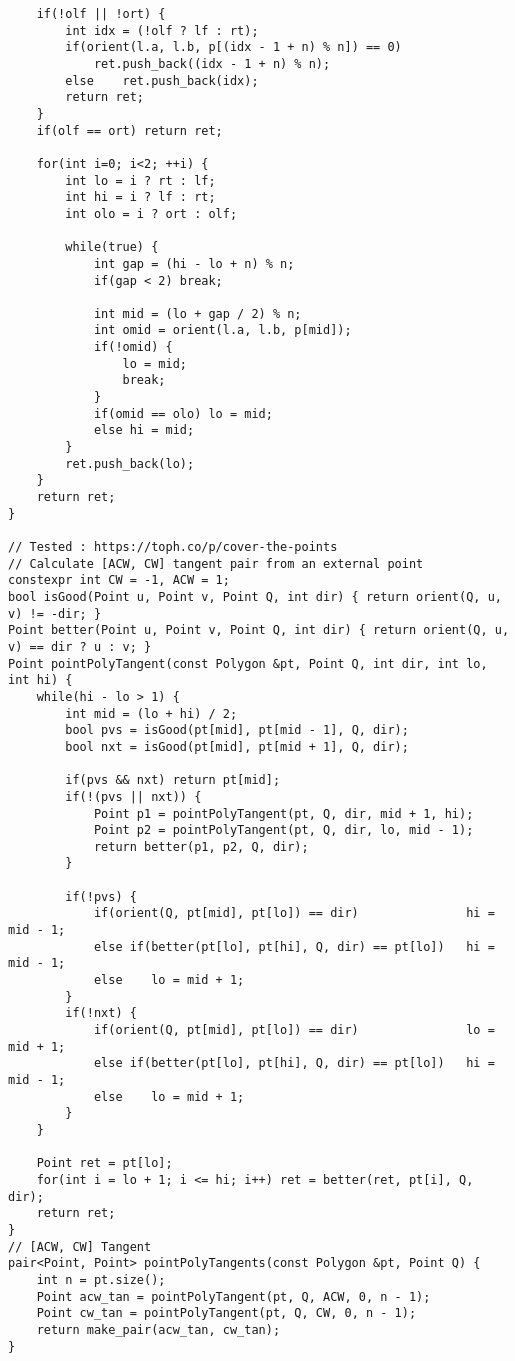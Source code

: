 \documentclass[FSZ,a4paper,onesided]{article}
\begin{document}
\begin{multicols*}{\COLS}
\begin{lstlisting}
    if(!olf || !ort) {
        int idx = (!olf ? lf : rt);
        if(orient(l.a, l.b, p[(idx - 1 + n) % n]) == 0)
            ret.push_back((idx - 1 + n) % n);
        else    ret.push_back(idx);
        return ret;
    }
    if(olf == ort) return ret;

    for(int i=0; i<2; ++i) {
        int lo = i ? rt : lf;
        int hi = i ? lf : rt;
        int olo = i ? ort : olf;

        while(true) {
            int gap = (hi - lo + n) % n;
            if(gap < 2) break;

            int mid = (lo + gap / 2) % n;
            int omid = orient(l.a, l.b, p[mid]);
            if(!omid) {
                lo = mid;
                break;
            }
            if(omid == olo) lo = mid;
            else hi = mid;
        }
        ret.push_back(lo);
    }
    return ret;
}

// Tested : https://toph.co/p/cover-the-points
// Calculate [ACW, CW] tangent pair from an external point
constexpr int CW = -1, ACW = 1;
bool isGood(Point u, Point v, Point Q, int dir) { return orient(Q, u, v) != -dir; }
Point better(Point u, Point v, Point Q, int dir) { return orient(Q, u, v) == dir ? u : v; }
Point pointPolyTangent(const Polygon &pt, Point Q, int dir, int lo, int hi) {
    while(hi - lo > 1) {
        int mid = (lo + hi) / 2;
        bool pvs = isGood(pt[mid], pt[mid - 1], Q, dir);
        bool nxt = isGood(pt[mid], pt[mid + 1], Q, dir);

        if(pvs && nxt) return pt[mid];
        if(!(pvs || nxt)) {
            Point p1 = pointPolyTangent(pt, Q, dir, mid + 1, hi);
            Point p2 = pointPolyTangent(pt, Q, dir, lo, mid - 1);
            return better(p1, p2, Q, dir);
        }

        if(!pvs) {
            if(orient(Q, pt[mid], pt[lo]) == dir)               hi = mid - 1;
            else if(better(pt[lo], pt[hi], Q, dir) == pt[lo])   hi = mid - 1;
            else    lo = mid + 1;
        }
        if(!nxt) {
            if(orient(Q, pt[mid], pt[lo]) == dir)               lo = mid + 1;
            else if(better(pt[lo], pt[hi], Q, dir) == pt[lo])   hi = mid - 1;
            else    lo = mid + 1;
        }
    }

    Point ret = pt[lo];
    for(int i = lo + 1; i <= hi; i++) ret = better(ret, pt[i], Q, dir);
    return ret;
}
// [ACW, CW] Tangent
pair<Point, Point> pointPolyTangents(const Polygon &pt, Point Q) {
    int n = pt.size();
    Point acw_tan = pointPolyTangent(pt, Q, ACW, 0, n - 1);
    Point cw_tan = pointPolyTangent(pt, Q, CW, 0, n - 1);
    return make_pair(acw_tan, cw_tan);
}\end{lstlisting}

\end{multicols*}
\end{document}

